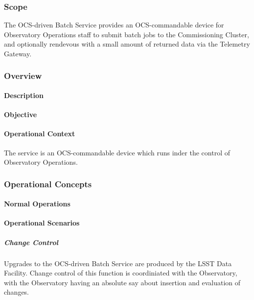 ﻿\subsubsection{Scope}

The OCS-driven Batch Service provides an OCS-commandable device for Observatory
Operations staff to submit batch jobs to the Commissioning Cluster, and optionally rendevous 
with a small amount of returned data via the Telemetry Gateway.

\subsubsection{Overview}

\paragraph{Description}


\paragraph{Objective}


\paragraph{Operational Context}

The service is an OCS-commandable device which runs inder the control of
Observatory  Operations.

\subsubsection{Operational Concepts}

\paragraph{Normal Operations}

\paragraph{Operational Scenarios}

\subparagraph{Change Control}

Upgrades to the OCS-driven Batch Service are produced by the LSST Data Facility. Change control 
of this function is coordiniated with the Observatory, with the Observatory having an absolute say
about insertion and evaluation of changes.
